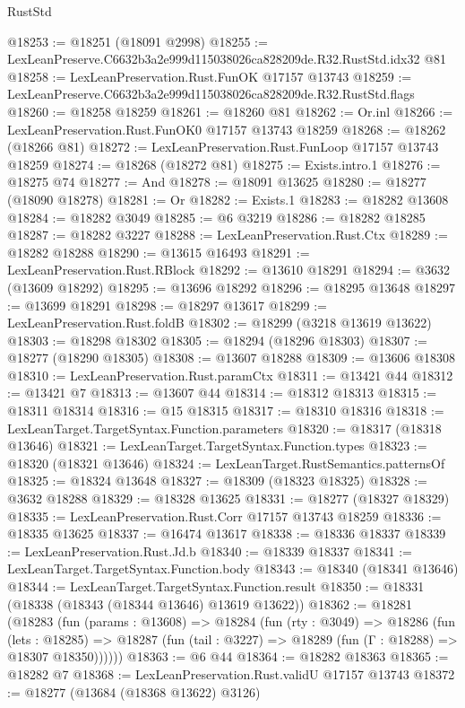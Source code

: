 \begin{lexlean}{RustStd}
\begin{coremodule}
@18253 := @18251 (@18091 @2998)
@18255 := LexLeanPreserve.C6632b3a2e999d115038026ca828209de.R32.RustStd.idx32 @81
@18258 := LexLeanPreservation.Rust.FunOK @17157 @13743
@18259 := LexLeanPreserve.C6632b3a2e999d115038026ca828209de.R32.RustStd.flags
@18260 := @18258 @18259
@18261 := @18260 @81
@18262 := Or.inl
@18266 := LexLeanPreservation.Rust.FunOK0 @17157 @13743 @18259
@18268 := @18262 (@18266 @81)
@18272 := LexLeanPreservation.Rust.FunLoop @17157 @13743 @18259
@18274 := @18268 (@18272 @81)
@18275 := Exists.intro.{1}
@18276 := @18275 @74
@18277 := And
@18278 := @18091 @13625
@18280 := @18277 (@18090 @18278)
@18281 := Or
@18282 := Exists.{1}
@18283 := @18282 @13608
@18284 := @18282 @3049
@18285 := @6 @3219
@18286 := @18282 @18285
@18287 := @18282 @3227
@18288 := LexLeanPreservation.Rust.Ctx
@18289 := @18282 @18288
@18290 := @13615 @16493
@18291 := LexLeanPreservation.Rust.RBlock
@18292 := @13610 @18291
@18294 := @3632 (@13609 @18292)
@18295 := @13696 @18292
@18296 := @18295 @13648
@18297 := @13699 @18291
@18298 := @18297 @13617
@18299 := LexLeanPreservation.Rust.foldB
@18302 := @18299 (@3218 @13619 @13622)
@18303 := @18298 @18302
@18305 := @18294 (@18296 @18303)
@18307 := @18277 (@18290 @18305)
@18308 := @13607 @18288
@18309 := @13606 @18308
@18310 := LexLeanPreservation.Rust.paramCtx
@18311 := @13421 @44
@18312 := @13421 @7
@18313 := @13607 @44
@18314 := @18312 @18313
@18315 := @18311 @18314
@18316 := @15 @18315
@18317 := @18310 @18316
@18318 := LexLeanTarget.TargetSyntax.Function.parameters
@18320 := @18317 (@18318 @13646)
@18321 := LexLeanTarget.TargetSyntax.Function.types
@18323 := @18320 (@18321 @13646)
@18324 := LexLeanTarget.RustSemantics.patternsOf
@18325 := @18324 @13648
@18327 := @18309 (@18323 @18325)
@18328 := @3632 @18288
@18329 := @18328 @13625
@18331 := @18277 (@18327 @18329)
@18335 := LexLeanPreservation.Rust.Corr @17157 @13743 @18259
@18336 := @18335 @13625
@18337 := @16474 @13617
@18338 := @18336 @18337
@18339 := LexLeanPreservation.Rust.Jd.b
@18340 := @18339 @18337
@18341 := LexLeanTarget.TargetSyntax.Function.body
@18343 := @18340 (@18341 @13646)
@18344 := LexLeanTarget.TargetSyntax.Function.result
@18350 := @18331 (@18338 (@18343 (@18344 @13646) @13619 @13622))
@18362 := @18281
    (@18283
      (fun (params : @13608) =>
      @18284
        (fun (rty : @3049) =>
        @18286
          (fun (lets : @18285) =>
          @18287 (fun (tail : @3227) => @18289 (fun (Γ : @18288) => @18307 @18350))))))
@18363 := @6 @44
@18364 := @18282 @18363
@18365 := @18282 @7
@18368 := LexLeanPreservation.Rust.validU @17157 @13743
@18372 := @18277 (@13684 (@18368 @13622) @3126)

\end{coremodule}
\end{lexlean}
